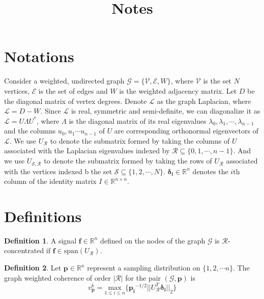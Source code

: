 \documentclass[a4paper]{article}
\title{Notes}
\newcommand{\R}{\mathcal{R}}
\newcommand{\RR}{\mathbb{R}}
\newcommand{\N}{\mathbb{N}}
\newcommand{\G}{\mathcal{G}}
\newcommand{\V}{\mathcal{V}}
\newcommand{\E}{\mathcal{E}}
\newcommand{\La}{\mathcal{L}}
\newcommand{\UR}{U_{\mathcal{R}}}
\newcommand{\vv}{\mathit{v}}
\theoremstyle{definition}
\newtheorem*{definition}{Definition}
\begin{document}
\maketitle

\newpage

\section{Notations}
Consider a weighted, undirected graph $\G = \{ \V, \E, W\}$, where $\V$ is the set $N$ vertices, $\E$ is the set of edges and $W$ is the weighted adjacency matrix. Let $D$ be the diagonal matrix of vertex degrees. Denote $\La$ as the graph Laplacian, where $\La = D-W$. Since $\La$ is real, symmetric and semi-definite, we can diagonalize it as $\La =U\Lambda U^*$, where $\Lambda$ is the diagonal matrix of its real eigenvalues $\lambda_0, \lambda_1,\cdots, \lambda_{n-1}$ and the columns $u_0, u_1 \cdots u_{n-1}$ of $U$ are corresponding orthonormal eigenvectors of $\La$. We use $\UR$ to denote the submatrix formed by taking the columns of $U$ associated with the Laplacian eigenvalues indexed by $\mathcal{R} \subseteq \{0,1,\cdots,n-1\}$. And we use $U_{\mathcal{S},\mathcal{R}}$ to denote the submatrix formed by taking the rows of $U_{\mathcal{R}}$ associated with the vertices indexed b the set $\mathcal{S} \subseteq \{1,2,\cdots, N\}$. $\bm{\delta_i} \in \RR^n$ denotes the $i$th column of the identity matrix $I \in \RR^{n\times n}.$

\medskip

\section{Definitions}

\begin{definition}
A signal $\bm{f} \in \RR^n$ defined on the nodes of the graph $\G$ is $\R$-concentrated if $\bm{f} \in \text{span}(U_{\R})$.
\end{definition}

\begin{definition}
Let $\bm{p} \in \RR^{n}$ represent a sampling distribution on $\{1,2,\cdots n\}$. The graph weighted coherence of order $|\R| $ for the pair $(\G, \bm{p})$ is
$$ \vv^k_{\bm{p}} = \underset{1\leq i\leq n}{\text{ max }} \{\bm{p_i}^{-1/2} ||U_{\R}^T \bm{\delta_i} ||_2\}$$

\end{definition}
\end{document}

